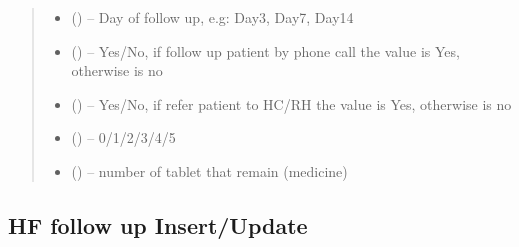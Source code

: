 \documentclass[letterpaper,10pt,english,openany,oneside]{sphinxmanual}
\begin{document}
\begin{fulllineitems}
\begin{quote}
\begin{description}
\begin{itemize}
\item {} 
\sphinxAtStartPar
{} () – Day of follow up, e.g: Day3, Day7, Day14

\item {} 
\sphinxAtStartPar
{} () – Yes/No, if follow up patient by phone call the value is Yes, otherwise is no

\item {} 
\sphinxAtStartPar
{} () – Yes/No, if refer patient to HC/RH the value is Yes, otherwise is no

\item {} 
\sphinxAtStartPar
{} () – 0/1/2/3/4/5

\item {} 
\sphinxAtStartPar
{} () – number of tablet that remain (medicine)

\end{itemize}

\end{description}\end{quote}

\end{fulllineitems}



\subsection{HF follow up Insert/Update}
\label{\detokenize{api/v4:hf-follow-up-insert-update}}
\end{document}
